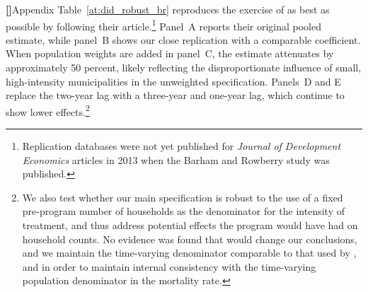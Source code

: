 \documentclass[12pt]{article}
\newcounter{paragraphnum}
\newcommand{\p}{\refstepcounter{paragraphnum}\textbf{[\theparagraphnum]}\enspace}
\begin{document}
\p Appendix Table~\ref{at:did_robust_br} reproduces the exercise of \citet{BarhamRowberry2013JDE} as best as possible by following their article.\footnote{Replication databases were not yet published for \textit{Journal of Development Economics} articles in 2013 when the Barham and Rowberry study was published.} Panel~A reports their original pooled estimate, while panel~B shows our close replication with a comparable coefficient. When population weights are added in panel~C, the estimate attenuates by approximately 50 percent, likely reflecting the disproportionate influence of small, high-intensity municipalities in the unweighted specification. Panels~D and E replace the two-year lag with a three-year and one-year lag, which continue to show lower effects.\footnote{We also test whether our main specification is robust to the use of a fixed pre-program number of households as the denominator for the intensity of treatment, and thus address potential effects the program would have had on household counts. No evidence was found that would change our conclusions, and we maintain the time-varying denominator comparable to that used by \cite{BarhamRowberry2013JDE}, and in order to maintain internal consistency with the time-varying population denominator in the mortality rate.}
\end{document}
